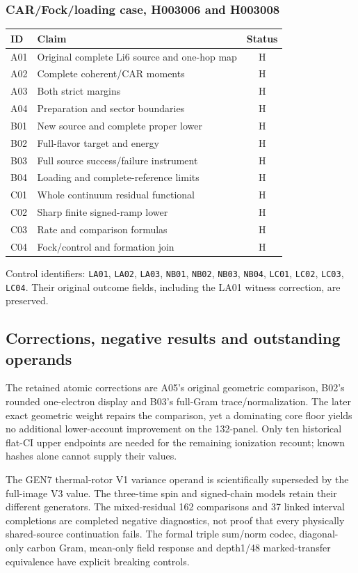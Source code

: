 \subsubsection{CAR/Fock/loading case, H003006 and H003008}
\begin{center}\small\begin{tabular}{lp{2.15in}c}\toprule ID&Claim&Status\\\midrule
A01&Original complete Li6 source and one-hop map&H\\
A02&Complete coherent/CAR moments&H\\
A03&Both strict margins&H\\
A04&Preparation and sector boundaries&H\\
B01&New source and complete proper lower&H\\
B02&Full-flavor target and energy&H\\
B03&Full source success/failure instrument&H\\
B04&Loading and complete-reference limits&H\\
C01&Whole continuum residual functional&H\\
C02&Sharp finite signed-ramp lower&H\\
C03&Rate and comparison formulas&H\\
C04&Fock/control and formation join&H\\
\bottomrule\end{tabular}\end{center}
Control identifiers: \texttt{LA01}, \texttt{LA02}, \texttt{LA03}, \texttt{NB01}, \texttt{NB02}, \texttt{NB03}, \texttt{NB04}, \texttt{LC01}, \texttt{LC02}, \texttt{LC03}, \texttt{LC04}. Their original outcome fields, including the LA01 witness correction, are preserved.
\subsection{Corrections, negative results and outstanding operands}
The retained atomic corrections are A05's original geometric comparison,
B02's rounded one-electron display and B03's full-Gram trace/normalization.
The later exact geometric weight repairs the comparison, yet a dominating
core floor yields no additional lower-account improvement on the 132-panel.
Only ten historical flat-CI upper endpoints are needed for the remaining
ionization recount; known hashes alone cannot supply their values.

The GEN7 thermal-rotor V1 variance operand is scientifically superseded by
the full-image V3 value. The three-time spin and signed-chain models retain
their different generators. The mixed-residual 162 comparisons and 37 linked
interval completions are completed negative diagnostics, not proof that
every physically shared-source continuation fails. The formal triple
sum/norm codec, diagonal-only carbon Gram, mean-only field response and
depth1/48 marked-transfer equivalence have explicit breaking controls.

